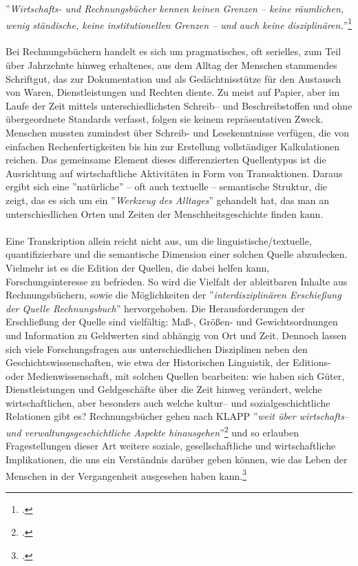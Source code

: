 \documentclass[12pt,a4paper]{article}
\begin{document}
''\textit{Wirtschafts- und Rechnungsbücher kennen keinen Grenzen -- keine räumlichen, wenig ständische, keine institutionellen Grenzen -- und auch keine disziplinären.}''\footcite[][S.51]{gleba2016rechnen}
\\
\\
Bei Rechnungsbüchern handelt es sich um pragmatisches, oft serielles, zum Teil über Jahrzehnte hinweg erhaltenes, aus dem Alltag der Menschen stammendes Schriftgut, das zur Dokumentation und als Gedächtnisstütze für den Austausch von Waren, Dienstleistungen und Rechten diente. Zu meist auf Papier, aber im Laufe der Zeit mittels unterschiedlichsten Schreib-- und Beschreibstoffen und ohne übergeordnete Standards verfasst, folgen sie keinem repräsentativen Zweck. Menschen mussten zumindest über Schreib- und Lesekenntnisse verfügen, die von einfachen Rechenfertigkeiten bis hin zur Erstellung vollständiger Kalkulationen reichen. Das gemeinsame Element dieses differenzierten Quellentypus ist die Ausrichtung auf wirtschaftliche Aktivitäten in Form von Transaktionen. Daraus ergibt sich eine ''natürliche'' -- oft auch textuelle -- semantische Struktur, die zeigt, das es sich um ein ''\textit{Werkzeug des Alltages}'' gehandelt hat, das man an unterschiedlichen Orten und Zeiten der Menschheitsgeschichte finden kann.
\\
\\
Eine Transkription allein reicht nicht aus, um die linguistische/textuelle, quantifizierbare und die semantische Dimension einer solchen Quelle abzudecken. Vielmehr ist es die Edition der Quellen, die dabei helfen kann, Forschungsinteresse zu befrieden. So wird die Vielfalt der ableitbaren Inhalte aus Rechnungsbüchern, sowie die Möglichkeiten der ''\textit{interdisziplinären Erschießung der Quelle Rechnungsbuch}'' hervorgehoben. Die Herausforderungen der Erschließung der Quelle sind vielfältig: Maß-, Größen- und Gewichtsordnungen und Information zu Geldwerten sind abhängig von Ort und Zeit. Dennoch lassen sich viele Forschungsfragen aus unterschiedlichen Disziplinen neben den Geschichtswissenschaften, wie etwa der Historischen Linguistik, der Editions- oder Medienwissenschaft, mit solchen Quellen bearbeiten: wie haben sich Güter, Dienstleistungen und Geldgeschäfte über die Zeit hinweg verändert, welche wirtschaftlichen, aber besonders auch welche kultur-- und sozialgeschichtliche Relationen gibt es? Rechnungsbücher gehen nach KLAPP ''\textit{weit über wirtschafts-- und verwaltungsgeschichtliche
Aspekte hinausgehen}''\footcite[][S.14]{klapp2011rechnung} und so erlauben Fragestellungen dieser Art weitere soziale, gesellschaftliche und wirtschaftliche Implikationen, die uns ein Verständnis darüber geben können, wie das Leben der Menschen in der Vergangenheit ausgesehen haben kann.\footcite[][S.7-10]{gleba2015einleitung}
\end{document}

